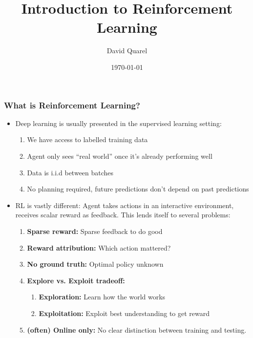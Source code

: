 \documentclass[10pt,a4paper]{beamer}
\begin{document}
\title[Introduction to Reinforcement Learning] %
{Introduction to Reinforcement Learning }

 
\author[David Quarel] %
{David Quarel}
 
 
\date[\today] %
{\today}
 
\frame{\titlepage}

\begin{frame}
\frametitle{What is Reinforcement Learning?}
\begin{itemize}
	\item Deep learning is usually presented in the supervised learning setting:
	\begin{enumerate} 
		\item We have access to labelled training data
		\item  Agent only sees ``real world'' once it's already performing well 
		\item Data is i.i.d between batches 
		\item No planning required, future predictions don't depend on past
		predictions
	\end{enumerate}  
	\pause
	\item RL is vastly different: Agent takes actions in an interactive environment,
	receives scalar reward as feedback. This lends itself to several problems:
	\begin{enumerate}
		\item  \textbf{Sparse reward:} Sparse feedback to do good

		\item \textbf{Reward attribution:} Which action mattered?

		\item \textbf{No ground truth:} Optimal policy unknown

		\item \textbf{Explore vs. Exploit tradeoff:}
		\begin{enumerate}
			\item \textbf{Exploration:} Learn how the world works
			\item \textbf{Exploitation:} Exploit best understanding to get reward
		\end{enumerate} 
	\item \textbf{(often) Online only:} No clear distinction between training and testing.
	\end{enumerate} 
\end{itemize}
	
\end{frame}
\end{document}
